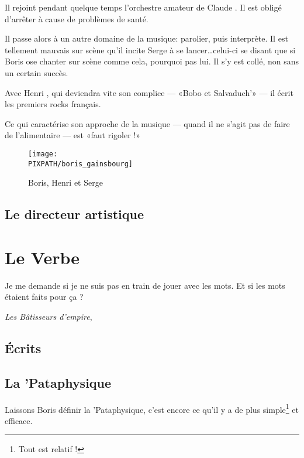 Il rejoint pendant quelque temps l'orchestre amateur
de Claude . Il est obligé d'arrêter à cause
de problèmes de santé.

Il passe alors à un autre domaine de la musique: parolier, puis interprète. Il est tellement
mauvais sur scène qu'il incite Serge   à se lancer\ldots celui-ci se disant
que si Boris ose chanter sur scène comme cela, pourquoi pas lui. Il s'y est collé, non sans
un certain succès.

Avec Henri , qui deviendra vite son complice --- «Bobo et Salvaduch'» --- il
écrit les premiers rocks français.

Ce qui caractérise son approche de la musique --- quand il ne s'agit pas de faire de
l'alimentaire --- est «faut rigoler !»


\begin{figure}
\centering
\texttt{[image: \\PIXPATH/boris\_gainsbourg]}
\caption{Boris, Henri et Serge}
\end{figure}

\subsection{Le directeur artistique}

\section{Le Verbe}
\epigraph{Je me demande si je ne suis pas en train de jouer avec les mots. Et si les mots étaient faits pour ça ?}
{\emph{Les Bâtisseurs d'empire}, \BV}

\subsection{Écrits}

\subsection{La 'Pataphysique}

Laissons Boris définir la 'Pataphysique, c'est encore ce qu'il y
a de plus simple\footnote{Tout est relatif !} et efficace.

